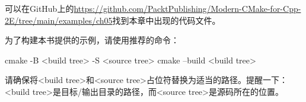 可以在GitHub上的\url{https://github.com/PacktPublishing/Modern-CMake-for-Cpp-2E/tree/main/examples/ch05}找到本章中出现的代码文件。

为了构建本书提供的示例，请使用推荐的命令：

\begin{shell}
cmake -B <build tree> -S <source tree>
cmake --build <build tree>
\end{shell}

请确保将<build tree>和<source tree>占位符替换为适当的路径。提醒一下：<build tree>是目标/输出目录的路径，而<source tree>是源码所在的位置。








